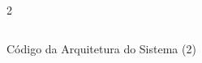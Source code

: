 \begin{figure}[H]
    \centering   
    \begin{tcolorbox}  
        \begin{multicols}{2} 
        \fontsize{9pt}{9pt}\selectfont\inputminted[obeytabs=true,tabsize=4,xleftmargin=20pt,linenos,breaklines,firstline=63]{VHDL}{VHDL/files/TLAB3.vhd}    
        \end{multicols}
    \end{tcolorbox}
    \caption{Código da Arquitetura do Sistema (2)}
\end{figure}